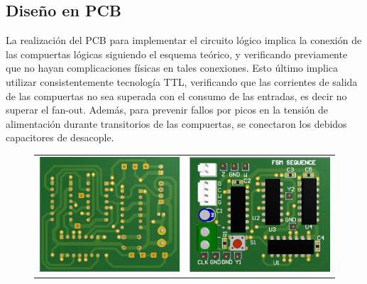 \subsection{Dise\~no en PCB}
La realizaci\'on del PCB para implementar el circuito l\'ogico implica la conexi\'on de las compuertas l\'ogicas siguiendo
el esquema te\'orico, y verificando previamente que no hayan complicaciones f\'isicas en tales conexiones. Esto \'ultimo implica
utilizar consistentemente tecnolog\'ia TTL, verificando que las corrientes de salida de las compuertas no sea superada con el consumo
de las entradas, es decir no superar el fan-out. Adem\'as, para prevenir fallos por picos en la tensi\'on de alimentaci\'on durante transitorios de las compuertas,
se conectaron los debidos capacitores de desacople.

\begin{figure}[H]
    \centering
    \begin{tabular}{c c}
        \includegraphics[scale=0.45]{../EJ2/Recursos/pcb_3d_bottom.PNG} & 
        \includegraphics[scale=0.45]{../EJ2/Recursos/pcb_3d_top.PNG} \\

\end{tabular}
\end{figure}
